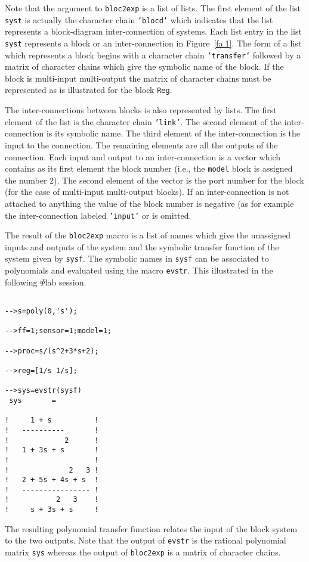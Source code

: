 %
Note that the argument to {\tt bloc2exp} is a list of lists.  The 
first element of the list {\tt syst} is actually the character chain
{\tt 'blocd'} which indicates that the list represents a block-diagram
inter-connection of systems.  Each list entry in the list {\tt syst}
represents a block or an inter-connection in Figure~\ref{fa.1}.
The form of a list which represents a block begins with a character
chain {\tt 'transfer'} followed by a matrix of character chains
which give the symbolic name of the block.  If the block is multi-input
multi-output the matrix of character chains must be represented as
is illustrated for the block {\tt Reg}.  

	The inter-connections between blocks is also represented by lists.  
The first element of the list is the character chain {\tt 'link'}.
The second element of the inter-connection is its symbolic name.
The third element of the inter-connection is the input to the connection.
The remaining elements are all the outputs of the connection.
Each input and output to an inter-connection is a vector which
contains as its first element the block number (i.e., the {\tt model}
block is assigned the number $2$).  The second element of the vector
is the port number for the block (for the case of multi-input multi-output
blocks).  If an inter-connection is not attached to anything the value
of the block number is negative (as for example the inter-connection
labeled {\tt 'input'} or is omitted.

	The result of the {\tt bloc2exp} macro is a list of names
which give the unassigned inputs and outputs of the system and
the symbolic transfer function of the system given by {\tt sysf}.
The symbolic names in {\tt sysf} can be associated to polynomials
and evaluated using the macro {\tt evstr}.  This illustrated in the
following $\Psi$lab session.
%
\begin{verbatim}
 
-->s=poly(0,'s');
 
-->ff=1;sensor=1;model=1;
 
-->proc=s/(s^2+3*s+2);
 
-->reg=[1/s 1/s];
 
-->sys=evstr(sysf)
 sys       =
 
!     1 + s          !
!   ----------       !
!             2      !
!   1 + 3s + s       !
!                    !
!              2   3 !
!   2 + 5s + 4s + s  !
!   ---------------- !
!           2   3    !
!     s + 3s + s     !

\end{verbatim}
%
The resulting polynomial transfer function relates the input
of the block system to the two outputs.  Note that the output
of {\tt evstr} is the rational polynomial matrix {\tt sys}
whereas the output of {\tt bloc2exp} is a matrix of character chains.

